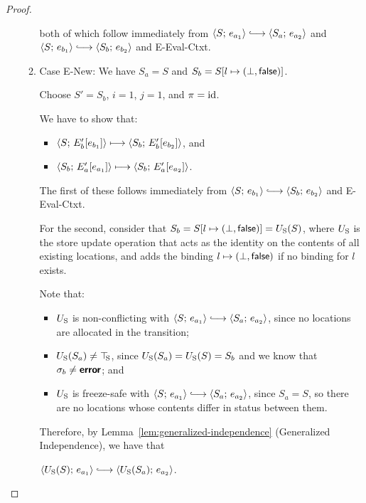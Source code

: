 \begin{proof}
\begin{enumerate}
\begin{enumerate}
      both of which follow immediately from $\config{S}{e_{a_1}}
      \parstepsto \config{S_a}{e_{a_2}}$ and $\config{S}{e_{b_1}}
      \parstepsto \config{S_b}{e_{b_2}}$ and {\sc E-Eval-Ctxt}.

    \item \label{slqc-beta-new}Case {\sc E-New}: We have $S_a = S$ and
      $S_b = S[l \mapsto (\bot, \textsf{false})]$.

      Choose $S' = S_b$, $i = 1$, $j = 1$, and $\pi = \mathrm{id}$.

      We have to show that:
      \begin{itemize}
      \item $\langle S;\, E'_b\hspace{-0.5mm}\left[e_{b_1}\right] \rangle \longmapsto
        \langle S_b;\, E'_b\hspace{-0.5mm}\left[e_{b_2}\right] \rangle$, and
      \item $\langle S_b;\, E'_a\hspace{-0.5mm}\left[e_{a_1}\right] \rangle \longmapsto
        \langle S_b;\, E'_a\hspace{-0.5mm}\left[e_{a_2}\right] \rangle$.
      \end{itemize}

      The first of these follows immediately from $\config{S}{e_{b_1}}
      \parstepsto \config{S_b}{e_{b_2}}$ and {\sc E-Eval-Ctxt}.

      For the second, consider that $S_b =
      S[l \mapsto (\bot, \textsf{false})] = U_{\mathrm{S}}(S)$, where $U_{\mathrm{S}}$ is the
      store update operation that acts as the identity on the contents
      of all existing locations, and adds the binding
      $l \mapsto (\bot, \textsf{false})$ if no binding for $l$
      exists.

      Note that:
      \begin{itemize}
      \item $U_{\mathrm{S}}$ is non-conflicting with $\config{S}{e_{a_1}}
        \parstepsto \config{S_a}{e_{a_2}}$, since no locations are
        allocated in the transition;
      \item $U_{\mathrm{S}}(S_a) \neq \top\hspace{-0.85mm}_{\mathrm{S}}$, since $U_{\mathrm{S}}(S_a) = U_{\mathrm{S}}(S) = S_b$
        and we know that $\sigma_b \neq \textbf{\textsf{error}}$; and
      \item $U_{\mathrm{S}}$ is freeze-safe with $\config{S}{e_{a_1}}
        \parstepsto \config{S_a}{e_{a_2}}$, since $S_a = S$, so
        there are no locations whose contents differ in status
        between them.
      \end{itemize}

      Therefore, by Lemma~\ref{lem:generalized-independence}
      (Generalized Independence), we have that

      $\config{\Ustore(S)}{e_{a_1}} \parstepsto
      \config{\Ustore(S_a)}{e_{a_2}}$.


\end{enumerate}
\end{enumerate}
\end{proof}
